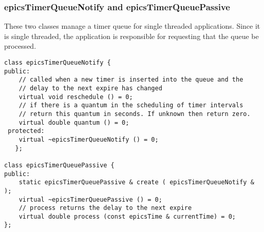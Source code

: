 \subsubsection{epicsTimerQueueNotify and epicsTimerQueuePassive}

These two classes manage a timer queue for single threaded applications. Since it is single threaded, the application is 
responsible for requesting that the queue be processed.

\begin{verbatim}
class epicsTimerQueueNotify {
public:
    // called when a new timer is inserted into the queue and the
    // delay to the next expire has changed
    virtual void reschedule () = 0;
    // if there is a quantum in the scheduling of timer intervals
    // return this quantum in seconds. If unknown then return zero.
    virtual double quantum () = 0;
 protected:
    virtual ~epicsTimerQueueNotify () = 0;
   };

class epicsTimerQueuePassive {
public:
    static epicsTimerQueuePassive & create ( epicsTimerQueueNotify & );
    virtual ~epicsTimerQueuePassive () = 0;
    // process returns the delay to the next expire
    virtual double process (const epicsTime & currentTime) = 0;
};
\end{verbatim}

